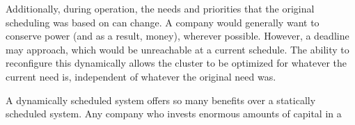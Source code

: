   Additionally, during operation, the needs and priorities that the original scheduling was based on can change.  A company would generally want to conserve power (and as a result, money), wherever possible.  However, a deadline may approach, which would be unreachable at a current schedule.  The ability to reconfigure this dynamically allows the cluster to be optimized for whatever the current need is, independent of whatever the original need was.

  A dynamically scheduled system offers so many benefits over a statically scheduled system.  Any company who invests enormous amounts of capital in a 